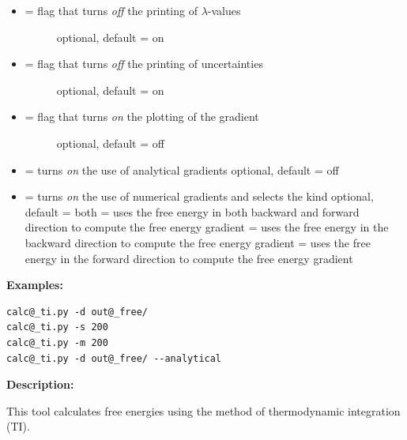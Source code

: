 \documentclass[letterpaper,10pt,english]{manual}
\begin{document}
\begin{itemize}
\begin{description}
\end{description}

\item {} \begin{description}
\item[{  = flag that turns \emph{off} the printing of $\lambda$-values}] \leavevmode
optional, default = on

\end{description}

\item {} \begin{description}
\item[{  = flag that turns \emph{off} the printing of uncertainties}] \leavevmode
optional, default = on

\end{description}

\item {} \begin{description}
\item[{  = flag that turns \emph{on} the plotting of the gradient}] \leavevmode
optional, default = off

\end{description}

\item {} 
 = turns \emph{on} the use of analytical gradients
optional, default = off

\item {} 
 = turns \emph{on} the use of numerical gradients and selects the kind
optional, default = both
 = uses the free energy in both backward and forward direction to compute the free energy gradient
 = uses the free energy in the backward direction to compute the free energy gradient
 = uses the free energy in the forward direction to compute the free energy gradient

\end{itemize}

\textbf{Examples:}

\begin{Verbatim}[commandchars=@\[\]]
calc@_ti.py -d out@_free/
calc@_ti.py -s 200
calc@_ti.py -m 200
calc@_ti.py -d out@_free/ --analytical
\end{Verbatim}

\textbf{Description:}

This tool calculates free energies using the method of thermodynamic integration (TI).
\end{document}
